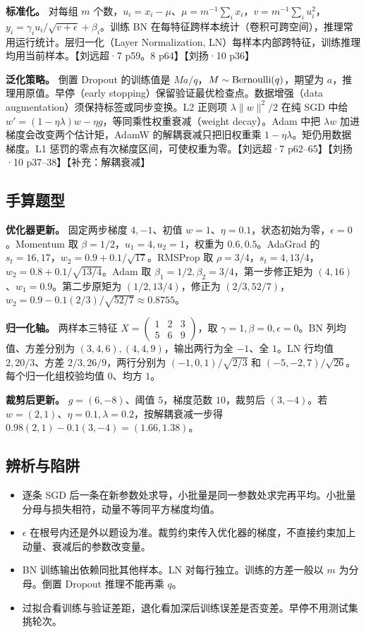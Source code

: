 \documentclass[UTF8,a4paper,zihao=-4,fontset=fandol]{ctexart}
\begin{document}
\textbf{标准化。} 对每组 $m$ 个数，$u_i=x_i-\mu$、$\mu=m^{-1}\sum_i x_i$，$v=m^{-1}\sum_i u_i^2$，$y_i=\gamma_i u_i/\sqrt{v+\epsilon}+\beta_i$。训练 BN 在每特征跨样本统计（卷积可跨空间），推理常用运行统计。层归一化（Layer Normalization, LN）每样本内部跨特征，训练推理均用当前样本。【刘远超·7 p59。8 p64】【刘扬·10 p36】

\textbf{泛化策略。} 倒置 Dropout 的训练值是 $M a/q$，$M\sim{\rm Bernoulli}(q)$，期望为 $a$，推理用原值。早停（early stopping）保留验证最优检查点。数据增强（data augmentation）须保持标签或同步变换。L2 正则项 $\lambda\|w\|^2/2$ 在纯 SGD 中给 $w'=(1-\eta\lambda)w-\eta g$，等同乘性权重衰减（weight decay）。Adam 中把 $\lambda w$ 加进梯度会改变两个估计矩，AdamW 的解耦衰减只把旧权重乘 $1-\eta\lambda$。矩仍用数据梯度。L1 惩罚的零点有次梯度区间，可使权重为零。【刘远超·7 p62--65】【刘扬·10 p37--38】【补充：解耦衰减】

\subsection{手算题型}

\textbf{优化器更新。} 固定两步梯度 $4,-1$、初值 $w=1$、$\eta=0.1$，状态初始为零，$\epsilon=0$。Momentum 取 $\beta=1/2$，$u_1=4,u_2=1$，权重为 $0.6,0.5$。AdaGrad 的 $s_t=16,17$，$w_2=0.9+0.1/\sqrt{17}$。RMSProp 取 $\rho=3/4$，$s_t=4,13/4$，$w_2=0.8+0.1/\sqrt{13/4}$。Adam 取 $\beta_1=1/2,\beta_2=3/4$，第一步修正矩为 $(4,16)$、$w_1=0.9$。第二步原矩为 $(1/2,13/4)$，修正为 $(2/3,52/7)$，$w_2=0.9-0.1(2/3)/\sqrt{52/7}\approx0.8755$。

\textbf{归一化轴。} 两样本三特征 $X=\begin{pmatrix}1&2&3\\5&6&9\end{pmatrix}$，取 $\gamma=1,\beta=0,\epsilon=0$。BN 列均值、方差分别为 $(3,4,6),(4,4,9)$，输出两行为全 $-1$、全 $1$。LN 行均值 $2,20/3$、方差 $2/3,26/9$，两行分别为 $(-1,0,1)/\sqrt{2/3}$ 和 $(-5,-2,7)/\sqrt{26}$。每个归一化组校验均值 $0$、均方 $1$。

\textbf{裁剪后更新。} $g=(6,-8)$、阈值 $5$，梯度范数 $10$，裁剪后 $(3,-4)$。若 $w=(2,1)$、$\eta=0.1,\lambda=0.2$，按解耦衰减一步得 $0.98(2,1)-0.1(3,-4)=(1.66,1.38)$。

\subsection{辨析与陷阱}

\begin{itemize}
\item 逐条 SGD 后一条在新参数处求导，小批量是同一参数处求完再平均。小批量分母与损失相符，动量不等同平方梯度均值。
\item $\epsilon$ 在根号内还是外以题设为准。裁剪约束传入优化器的梯度，不直接约束加上动量、衰减后的参数改变量。
\item BN 训练输出依赖同批其他样本。LN 对每行独立。训练的方差一般以 $m$ 为分母。倒置 Dropout 推理不能再乘 $q$。
\item 过拟合看训练与验证差距，退化看加深后训练误差是否变差。早停不用测试集挑轮次。
\end{itemize}
\end{document}

